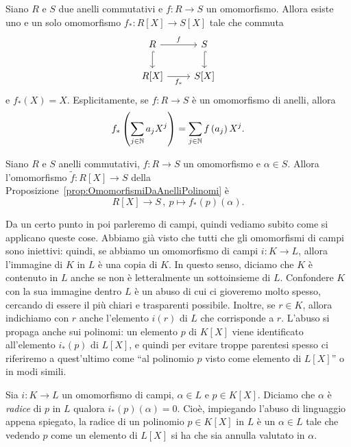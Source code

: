\begin{coro}
Siano $R$ e $S$ due anelli commutativi e $f : R \to S$ un omomorfismo. Allora esiste uno e un solo omomorfismo $f_\ast : R[X] \to S[X]$ tale che commuta
\[\begin{tikzcd}
R \ar[hookrightarrow, d] \ar["f", r] & S \ar[hookrightarrow,d]   \\ %
R[X] \ar["{f_\ast}", r, swap] &             S[X]
\end{tikzcd}\]
e $f_\ast(X) = X$. Esplicitamente, se $f : R \to S$ è un omomorfismo di anelli, allora %
\[f_\ast \left( \sum_{j \in \mathbb{N}} a_j X^j \right) = \sum_{j \in \mathbb{N}} f\left(a_j\right) X^j .\]
\end{coro}

\begin{coro}
Siano $R$ e $S$ anelli commutativi, $f : R \to S$ un omomorfismo e $\alpha \in S$. Allora l'omomorfismo $\tilde f : R[X] \to S$ della Proposizione~\ref{prop:OmomorfismiDaAnelliPolinomi} è
\[R[X] \to S\,,\ p \mapsto f_\ast(p)(\alpha) .\]
\end{coro}

Da un certo punto in poi parleremo di campi, quindi vediamo subito come si applicano queste cose. Abbiamo già visto che tutti che gli omomorfismi di campi sono iniettivi: quindi, se abbiamo un omomorfismo di campi $i : K \to L$, allora l'immagine di $K$ in $L$ è una copia di $K$. In questo senso, diciamo che $K$ è contenuto in $L$ anche se non è letteralmente un sottoinsieme di $L$. Confondere $K$ con la sua immagine dentro $L$ è un abuso di cui ci gioveremo molto spesso, cercando di essere il più chiari e trasparenti possibile. Inoltre, se $r \in K$, allora indichiamo con $r$ anche l'elemento $i(r)$ di $L$ che corrisponde a $r$. L'abuso si propaga anche sui polinomi: un elemento $p$ di $K[X]$ viene identificato all'elemento $i_\ast(p)$ di $L[X]$, e quindi per evitare troppe parentesi spesso ci riferiremo a quest'ultimo come \enquote{al polinomio $p$ visto come elemento di $L[X]$} o in modi simili. 

\begin{defi}
Sia $i : K \to L$ un omomorfismo di campi, $\alpha \in L$ e $p \in K[X]$. Diciamo che $\alpha$ è {\em radice} di $p$ in $L$ qualora $i_\ast (p)(\alpha) = 0$. Cioè, impiegando l'abuso di linguaggio appena spiegato, la radice di un polinomio $p \in K[X]$ in $L$ è un $\alpha \in L$ tale che vedendo $p$ come un elemento di $L[X]$ si ha che sia annulla valutato in $\alpha$.
\end{defi}

